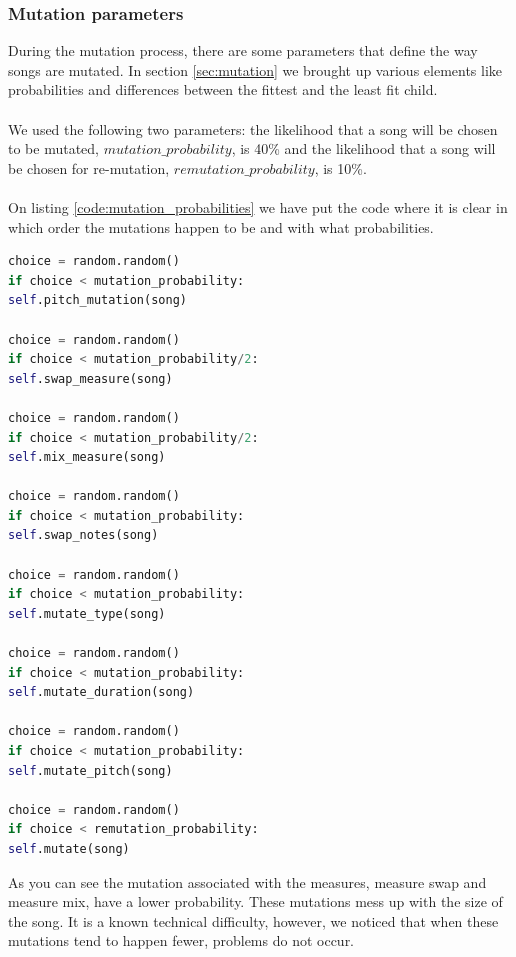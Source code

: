 \documentclass[a4paper]{article}
\begin{document}
\subsubsection{Mutation parameters}
During the mutation process, there are some parameters that define the way songs are mutated. In section \ref{sec:mutation} we brought up various elements like probabilities and differences between the fittest and the least fit child.
\\\\
We used the following two parameters: the likelihood that a song will be chosen to be mutated, $mutation\_probability$, is 40\% and the likelihood that a song will be chosen for re-mutation, $remutation\_probability$, is 10\%.
\\\\
On listing \ref{code:mutation_probabilities} we have put the code where it is clear in which order the mutations happen to be and with what probabilities.

\begin{lstlisting}[language=Python,caption={individual mutation probabilities.},captionpos=b,label=code:mutation_probabilities]
choice = random.random()
if choice < mutation_probability:
self.pitch_mutation(song)

choice = random.random()
if choice < mutation_probability/2:
self.swap_measure(song)

choice = random.random()
if choice < mutation_probability/2:
self.mix_measure(song)

choice = random.random()
if choice < mutation_probability:
self.swap_notes(song)

choice = random.random()
if choice < mutation_probability:
self.mutate_type(song)

choice = random.random()
if choice < mutation_probability:
self.mutate_duration(song)

choice = random.random()
if choice < mutation_probability:
self.mutate_pitch(song)

choice = random.random()
if choice < remutation_probability:
self.mutate(song)

\end{lstlisting}

As you can see the mutation associated with the measures, measure swap and measure mix, have a lower probability. These mutations mess up with the size of the song. It is a known technical difficulty, however, we noticed that when these mutations tend to happen fewer, problems do not occur.
 
\end{document}
